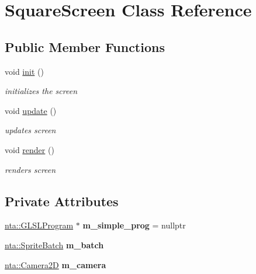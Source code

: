 \hypertarget{classSquareScreen}{}\section{Square\+Screen Class Reference}
\label{classSquareScreen}
\subsection*{Public Member Functions}
\begin{DoxyCompactItemize}
\item 
\mbox{\label{classSquareScreen_ae8586ec53731d0abd74e630f93ccb62c}} 
void \hyperlink{classSquareScreen_ae8586ec53731d0abd74e630f93ccb62c}{init} ()
\begin{DoxyCompactList}\small\item\em initializes the screen \end{DoxyCompactList}\item 
\mbox{\label{classSquareScreen_a3f642908c033b30e7e90443d03a38123}} 
void \hyperlink{classSquareScreen_a3f642908c033b30e7e90443d03a38123}{update} ()
\begin{DoxyCompactList}\small\item\em updates screen \end{DoxyCompactList}\item 
\mbox{\label{classSquareScreen_a105d092bc0a42565b62b8983af8dcce0}} 
void \hyperlink{classSquareScreen_a105d092bc0a42565b62b8983af8dcce0}{render} ()
\begin{DoxyCompactList}\small\item\em renders screen \end{DoxyCompactList}\end{DoxyCompactItemize}
\subsection*{Private Attributes}
\begin{DoxyCompactItemize}
\item 
\mbox{\label{classSquareScreen_a03cefdb728461c48b54da5747b391433}} 
\hyperlink{classnta_1_1GLSLProgram}{nta\+::\+G\+L\+S\+L\+Program} $\ast$ {\bfseries m\+\_\+simple\+\_\+prog} = nullptr
\item 
\mbox{\label{classSquareScreen_aa99327c145b8a15cfd3e6b09f8bc9bda}} 
\hyperlink{classnta_1_1SpriteBatch}{nta\+::\+Sprite\+Batch} {\bfseries m\+\_\+batch}
\item 
\mbox{\label{classSquareScreen_a57270def1aad5c9b4fb566bec4a863b0}} 
\hyperlink{classnta_1_1Camera2D}{nta\+::\+Camera2D} {\bfseries m\+\_\+camera}
\end{DoxyCompactItemize}
